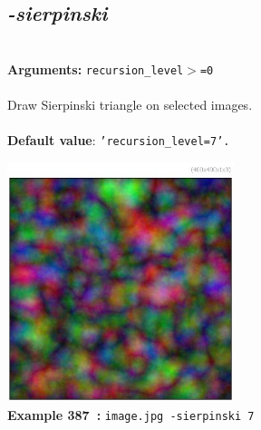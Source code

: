 \documentclass[a4paper,11pt,twoside]{book}
\begin{document}
\subsection{\emph{-sierpinski} }\vspace*{-0.5em}
~\\\textbf{Arguments: } 
{\small \texttt{recursion\_level$>$=0}}\\~\\
Draw Sierpinski triangle on selected images.
~\\~\\\textbf{Default value}: {\small \texttt{'recursion\_level=7'.}}
\begin{center}\includegraphics[keepaspectratio=true,height=7cm,width=\textwidth]{img/gmic_def387.jpg}\\
{\footnotesize \textbf{Example 387~:} \texttt{image.jpg -sierpinski 7}}
\end{center}
\end{document}
